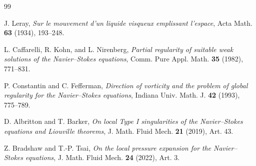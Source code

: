 \documentclass[11pt]{article}
\theoremstyle{definition}\newtheorem{definition}[theorem]{Definition}
\theoremstyle{remark}\newtheorem{remark}[theorem]{Remark}
\begin{document}
\begin{thebibliography}{99}

J. Leray,
\emph{Sur le mouvement d'un liquide visqueux emplissant l'espace},
Acta Math. \textbf{63} (1934), 193--248.

L. Caffarelli, R. Kohn, and L. Nirenberg,
\emph{Partial regularity of suitable weak solutions of the Navier--Stokes equations},
Comm. Pure Appl. Math. \textbf{35} (1982), 771--831.

P. Constantin and C. Fefferman,
\emph{Direction of vorticity and the problem of global regularity for the Navier--Stokes equations},
Indiana Univ. Math. J. \textbf{42} (1993), 775--789.

D. Albritton and T. Barker,
\emph{On local Type I singularities of the Navier--Stokes equations and Liouville theorems},
J. Math. Fluid Mech. \textbf{21} (2019), Art. 43.

Z. Bradshaw and T.-P. Tsai,
\emph{On the local pressure expansion for the Navier--Stokes equations},
J. Math. Fluid Mech. \textbf{24} (2022), Art. 3.

\end{thebibliography}
\end{document}
